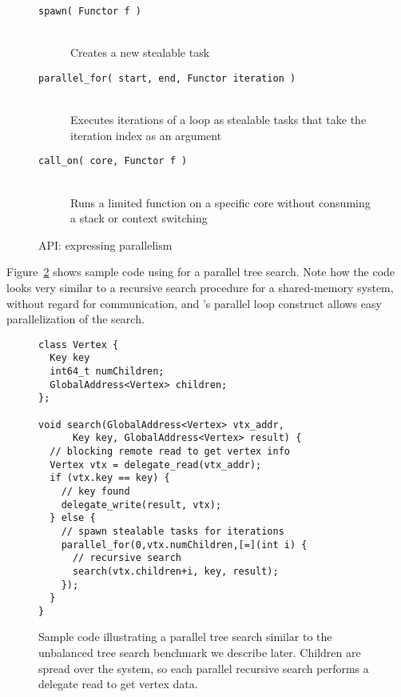 \begin{figure}[htbp]
  \begin{center}
	\begin{description}
    \item[\texttt{spawn( Functor f )}] \hfill \\
      Creates a new stealable task
    \item[\texttt{parallel\_for( start, end, Functor iteration )}] \hfill \\
      Executes iterations of a loop as stealable tasks that
      take the iteration index as an argument
    \item[\texttt{call\_on( core, Functor f )}] \hfill \\
      Runs a limited function on a specific core without
      consuming a stack or context switching
	\end{description}
    \begin{minipage}{0.95\columnwidth}
      \caption{\label{fig:expressing-parallelism} \Grappa API: expressing parallelism
      } %
    \end{minipage}
  \end{center}
\end{figure}

Figure~\ref{fig:sample} shows sample code using \Grappa for a parallel tree
search. Note how the code looks very similar to a recursive search procedure for a shared-memory system, without regard for communication, and \Grappa's parallel loop construct allows easy parallelization of the search.

\begin{figure}[htbp]
\begin{center}
\begin{scriptsize}
\begin{lstlisting}[style=grappa]
class Vertex {
  Key key
  int64_t numChildren;
  GlobalAddress<Vertex> children;
};

void search(GlobalAddress<Vertex> vtx_addr,
      Key key, GlobalAddress<Vertex> result) {
  // blocking remote read to get vertex info
  Vertex vtx = delegate_read(vtx_addr);
  if (vtx.key == key) {
    // key found
    delegate_write(result, vtx);
  } else {
    // spawn stealable tasks for iterations
    parallel_for(0,vtx.numChildren,[=](int i) {
      // recursive search
      search(vtx.children+i, key, result);       
    });
  }
}
\end{lstlisting}
\end{scriptsize}

    \begin{minipage}{\columnwidth}
      \caption{\label{fig:sample} Sample \Grappa code illustrating a
        parallel tree search similar to the unbalanced tree search
        benchmark we describe later. Children are spread over the system, so each parallel recursive search performs a delegate read to get vertex data.
      }
    \end{minipage}

\end{center}
\end{figure}

